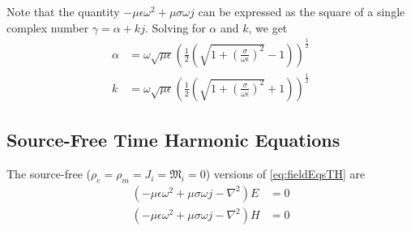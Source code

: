 \documentclass{article}
\numberwithin{equation}{section}
\begin{document}
            Note that the quantity $- \mu \epsilon \omega^2 + \mu \sigma \omega j $ can be
            expressed as the square of a single complex number $\gamma = \alpha + kj$.
            Solving for $\alpha$ and $k$, we get
            \begin{subequations}
            \begin{align} \label{eq:attenuationConstant}
                \alpha &= \omega \sqrt{\mu \epsilon} \left( \frac{1}{2} \left( \sqrt{1 +
                    \left( \frac{\sigma}{\omega \epsilon} \right)^2 } - 1 \right)
                    \right)^{\frac{1}{2}} \\
                k &= \omega \sqrt{\mu \epsilon} \left( \frac{1}{2} \left( \sqrt{1 + \left(
                    \frac{\sigma}{\omega \epsilon} \right)^2 } + 1 \right)
                    \right)^{\frac{1}{2}} \label{eq:wavenumber}
            \end{align}
            \end{subequations}
        \subsection{Source-Free Time Harmonic Equations}
            The source-free ($\rho_e = \rho_m = J_i = \mathfrak{M}_i = 0$) versions of
            \eqref{eq:fieldEqsTH} are
            \begin{subequations} \label{eq:fieldEqsSF}
                \begin{align}
                    (- \mu \epsilon \omega^2 + \mu \sigma \omega j - \nabla^2 ) E & = 0
                        \label{eq:electricFieldEqSF} \\
                    ( - \mu \epsilon \omega^2 + \mu \sigma \omega j - \nabla^2 ) H & = 0
                        \label{eq:magneticFieldEqSF}
                \end{align}
            \end{subequations}
\end{document}

